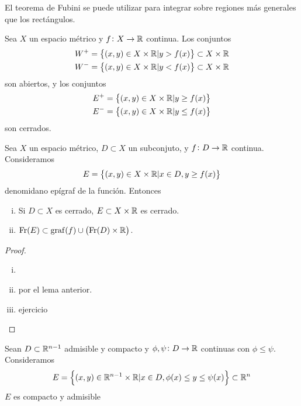 El teorema de Fubini se puede utilizar para integrar sobre regiones más generales que
los rectángulos.

\begin{lema}
    Sea $X$ un espacio m\'etrico y $f \colon X \to \mathbb{R}$ continua. Los conjuntos
    \begin{gather*}
        W^+ = \left\{(x, y) \in X \times \mathbb{R} \vert y > f(x)\right\} \subset X \times \mathbb{R} \\
        W^- = \left\{(x, y) \in X \times \mathbb{R} \vert y < f(x)\right\} \subset X \times \mathbb{R}
    \end{gather*}
    son abiertos, y los conjuntos
    \begin{gather*}
        E^+ = \left\{(x, y) \in X \times \mathbb{R} \vert y \geq f(x)\right\} \\
        E^- = \left\{(x, y) \in X \times \mathbb{R} \vert y \leq f(x)\right\}
    \end{gather*}
    son cerrados.
\end{lema}
\begin{lema}
    Sea $X$ un espacio m\'etrico, $D \subset X$ un subconjuto, y $f \colon D \to \mathbb{R}$
    continua. Consideramos
    \[
        E = \left\{(x, y) \in X \times \mathbb{R} \vert x \in D, y \geq f(x)\right\}
    \]
    denomidano epígraf de la función. Entonces
    \begin{enumerate}[i)]
        \item Si $D \subset X$ es cerrado, $E \subset X \times \mathbb{R}$ es cerrado.
        \item $\operatorname{Fr}(E) \subset \operatorname{graf}(f) \cup \left( \operatorname{Fr}(D) \times \mathbb{R} \right)$.
    \end{enumerate}
\end{lema}
\begin{proof}
    \begin{enumerate}[i)]
        \item[]
        \item por el lema anterior.
        \item ejercicio
    \end{enumerate}
\end{proof}

\begin{lema}
    Sean $D \subset \mathbb{R}^{n-1}$ admisible y compacto y $\phi, \psi \colon D \to \mathbb{R}$
    continuas con $\phi \leq \psi$. Consideramos
    \[
        E = \left\{(x, y) \in \mathbb{R}^{n-1} \times \mathbb{R} \vert x \in D,
        \phi(x) \leq y \leq \psi(x)\right\} \subset \mathbb{R}^n
    \]
    $E$ es compacto y admisible
\end{lema}

